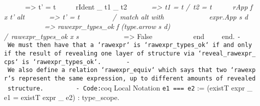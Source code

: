 ~ ~ ~ ~=\textgreater{} t' = t ~ ~ ~\textbar{} rIdent \_ t1 \_ t2 \emph{
~ ~ ~ ~=\textgreater{} t1 = t /~t2 = t ~ ~ ~\textbar{} rApp f x t' alt ~
~ ~ ~=\textgreater{} t' = t ~ ~ ~ ~ ~ /~match alt with ~ ~ ~ ~ ~ ~
~\textbar{} expr.App s d } \emph{ ~ ~ ~ ~ ~ ~ ~ ~=\textgreater{}
rawexpr\_types\_ok f (type.arrow s d) ~ ~ ~ ~ ~ ~ ~ ~ ~
/~rawexpr\_types\_ok x s ~ ~ ~ ~ ~ ~ ~\textbar{} } =\textgreater{} False
~ ~ ~ ~ ~ ~ ~end ~ ~ ~end.
\texttt{-\ We\ must\ then\ have\ that\ a\ `rawexpr`\ is\ `rawexpr\_types\_ok`\ if\ and\ only\ if\ the\ result\ of\ revealing\ one\ layer\ of\ structure\ via\ `reveal\_rawexpr\_cps`\ is\ `rawexpr\_types\_ok`.\ \ \ \ \ \ \ -\ We\ also\ define\ a\ relation\ `rawexpr\_equiv`\ which\ says\ that\ two\ `rawexpr`s\ represent\ the\ same\ expression,\ up\ to\ different\ amounts\ of\ revealed\ structure.\ \ \ \ \ \ \ \ \ -\ Code:}coq
Local Notation \texttt{e1\ ===\ e2} := (existT expr \_ e1 = existT expr
\_ e2) : type\_scope.

